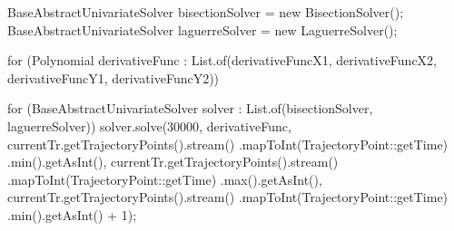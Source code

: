 BaseAbstractUnivariateSolver bisectionSolver = new BisectionSolver();
BaseAbstractUnivariateSolver laguerreSolver = new LaguerreSolver();

for (Polynomial derivativeFunc : 
			List.of(derivativeFuncX1, derivativeFuncX2, 
					derivativeFuncY1, derivativeFuncY2)) {

		for (BaseAbstractUnivariateSolver solver : 
					List.of(bisectionSolver, laguerreSolver)) {
			solver.solve(30000, derivativeFunc,
					currentTr.getTrajectoryPoints().stream()
						.mapToInt(TrajectoryPoint::getTime)
						.min().getAsInt(),
					currentTr.getTrajectoryPoints().stream()
						.mapToInt(TrajectoryPoint::getTime)
						.max().getAsInt(),
					currentTr.getTrajectoryPoints().stream()
						.mapToInt(TrajectoryPoint::getTime)
						.min().getAsInt() + 1);
		}
}